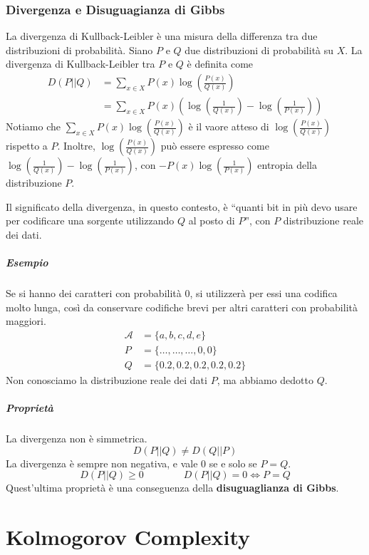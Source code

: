 \subsection{Divergenza e Disuguagianza di Gibbs}
La divergenza di Kullback-Leibler è una misura della differenza tra due distribuzioni di probabilità. Siano $P$ e $Q$ due distribuzioni di probabilità su $X$. La divergenza di Kullback-Leibler tra $P$ e $Q$ è definita come
\begin{align*}
    D(P||Q) &= \sum_{x\in X} P(x)\log\left(\frac{P(x)}{Q(x)}\right)\\
    &= \sum_{x\in X} P(x) \left( \log\left(\frac{1}{Q(x)}\right) - \log\left(\frac{1}{P(x)}\right) \right)
\end{align*}
Notiamo che $\sum_{x\in X} P(x)\log\left(\frac{P(x)}{Q(x)}\right)$ è il vaore atteso di $\log\left(\frac{P(x)}{Q(x)}\right)$ rispetto a $P$. Inoltre, $\log\left(\frac{P(x)}{Q(x)}\right)$ può essere espresso come $\log\left(\frac{1}{Q(x)}\right) - \log\left(\frac{1}{P(x)}\right)$, con $-P(x)\log\left(\frac{1}{P(x)}\right)$ entropia della distribuzione $P$.

Il significato della divergenza, in questo contesto, è ``quanti bit in più devo usare per codificare una sorgente utilizzando $Q$ al posto di $P$'', con $P$ distribuzione reale dei dati.

\paragraph{Esempio} Se si hanno dei caratteri con probabilità 0, si utilizzerà per essi una codifica molto lunga, così da conservare codifiche brevi per altri caratteri con probabilità maggiori.
\begin{align*}
    \mathcal{A} &= \{a,b,c,d,e\}\\
    P &= \{\dots,\dots,\dots,0,0\}\\
    Q &= \{0.2,0.2,0.2,0.2,0.2\}
\end{align*}
Non conosciamo la distribuzione reale dei dati $P$, ma abbiamo dedotto $Q$.

\paragraph{Proprietà} La divergenza non è simmetrica.
$$
    D(P||Q) \neq D(Q||P)
$$
La divergenza è sempre non negativa, e vale 0 se e solo se $P=Q$.
$$
    D(P||Q) \geq 0 \qquad\qquad D(P||Q) = 0 \Leftrightarrow P=Q
$$
Quest'ultima proprietà è una conseguenza della \textbf{disuguaglianza di Gibbs}.





\chapter{Kolmogorov Complexity}